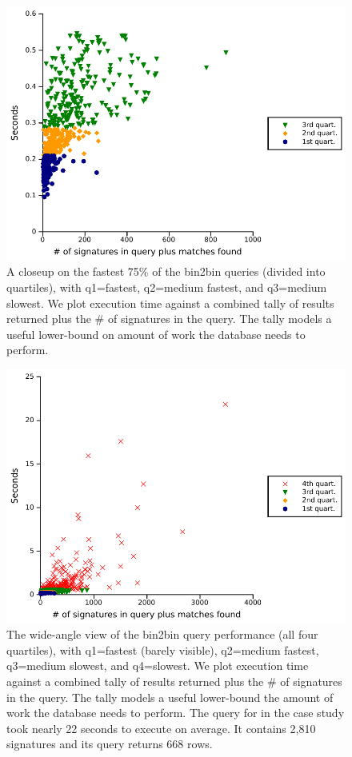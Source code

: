 \begin{figure}[h]
  \centering
\includegraphics[width=40em]{plots/a.pdf}
  \caption{\small{A closeup on the fastest 75\% of the bin2bin queries (divided
    into quartiles), with q1=fastest, q2=medium fastest, and q3=medium
    slowest.  We plot execution time against a combined tally of results
    returned plus the \# of signatures in the query.  The tally
    models a useful lower-bound on amount of work the database needs to perform.}
}
  \label{fig:perfBin2Bin3quartiles}
\end{figure}
\begin{figure}[h]
  \centering
\includegraphics[width=40em]{plots/b.pdf}
\vspace{-2mm}
  \caption{\small{The wide-angle view of the bin2bin query performance (all four
    quartiles), with q1=fastest (barely visible), q2=medium fastest,
    q3=medium slowest, and q4=slowest.  We plot execution time against a
    combined tally of results returned plus the \# of signatures in the
    query.  The tally models a useful lower-bound the amount of work the database needs to
    perform.  The query for  in the case study
    took nearly 22 seconds to execute on average.  It contains 2,810
    signatures and its query returns 668 rows.}
}
  \label{fig:perfBin2Bin}
\end{figure}
